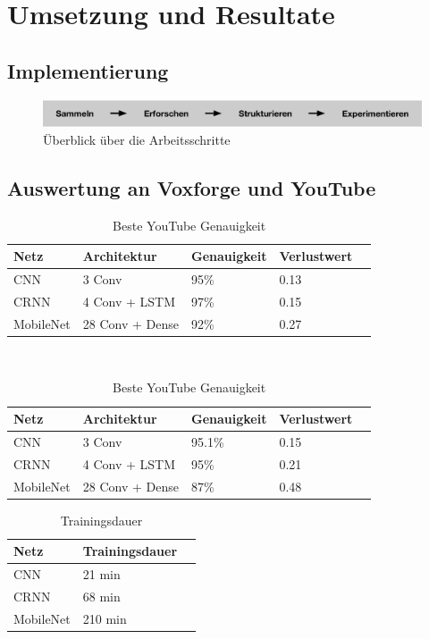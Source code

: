 \section{Umsetzung und Resultate}

\subsection{Implementierung}

 \begin{figure}[hbt]
	\centering
		\includegraphics[width=1.0\textwidth]{assets/vorgang_small.png}
	\caption{Überblick über die Arbeitsschritte}
	\label{img:vorgehen}
\end{figure}


\subsection{Auswertung an Voxforge und YouTube}

\begin{table}[h]
	\centering
	\begin{tabular}{lllll}
		\hline
		Netz & Architektur     & Genauigkeit & Verlustwert & \\ \hline
		CNN  & 3 Conv          & 95\%     & 0.13  \\
		CRNN & 4 Conv + LSTM   & 97\%     & 0.15  \\
		MobileNet  & 28 Conv + Dense & 92\%     & 0.27  \\ \hline
	\end{tabular} \\
	\caption{Beste Voxforge Genauigkeit}
	\label{table:test_vox}
	\vspace{0.3cm}
	\begin{tabular}{lllll}
		\hline
		Netz & Architektur     & Genauigkeit & Verlustwert & \\ \hline
		CNN  & 3 Conv          & 95.1\%     & 0.15  \\
		CRNN & 4 Conv + LSTM   & 95\%     & 0.21  \\
		MobileNet  & 28 Conv + Dense & 87\%     & 0.48  \\ \hline
	\end{tabular}
	\caption{Beste YouTube Genauigkeit}
	\label{table:test_you}
\end{table}

\begin{table}[h]
	\centering
	\begin{tabular}{lll}
		\hline
		Netz & Trainingsdauer \\ \hline
		CNN  & 21 min \\
		CRNN & 68 min \\
		MobileNet  & 210 min\\ \hline
	\end{tabular}
	\caption{Trainingsdauer}
	\label{table:test}
\end{table}


